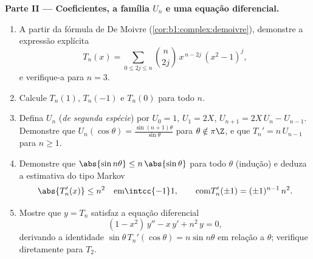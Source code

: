 \begin{problem}
\medskip
\noindent\textbf{Parte II --- Coeficientes, a família $U_n$ e uma
equação diferencial.}
\begin{enumerate}
  \item A partir da fórmula de De Moivre
        (\cref{cor:b1:complex:demoivre}), demonstre a expressão
        explícita
        \[
        T_n(x) = \sum_{0 \leq 2j \leq n} \binom{n}{2j}\,
        x^{\,n-2j}\,(x^2 - 1)^j ,
        \]
        e verifique-a para $n = 3$.
  \item Calcule $T_n(1)$, $T_n(-1)$ e $T_n(0)$ para todo $n$.
  \item Defina $U_n$ (\emph{de segunda espécie}) por $U_0 = 1$, $U_1 =
        2X$, $U_{n+1} = 2X\,U_n - U_{n-1}$. Demonstre que
        $U_n(\cos\theta) = \frac{\sin(n+1)\theta}{\sin\theta}$
        para $\theta \notin \pi\Z$, e que $T_n' = n\,U_{n-1}$
        para $n \geq 1$.
  \item Demonstre que $\abs{\sin n\theta} \leq n\,\abs{\sin\theta}$
        para todo $\theta$ (indução) e deduza a estimativa do tipo
        Markov
        \[
        \abs{T_n'(x)} \leq n^2
        \quad\text{em} \intcc{-1}1,
        \qquad\text{com} T_n'(\pm1) = (\pm1)^{n-1}\,n^2 .
        \]
  \item Mostre que $y = T_n$ satisfaz a equação diferencial
        \[
        (1 - x^2)\,y'' - x\,y' + n^2\,y = 0 ,
        \]
        derivando a identidade $\sin\theta\,
        T_n'(\cos\theta) = n\sin n\theta$ em relação a
        $\theta$; verifique diretamente para $T_2$.
\end{enumerate}


\end{problem}
